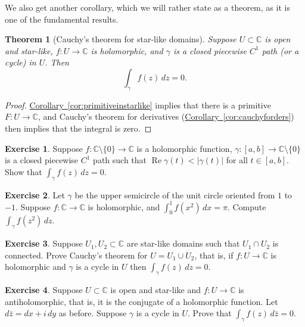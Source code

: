 \documentclass[12pt,openany]{book}
\renewcommand{\Re}{\operatorname{Re}}
\newcommand{\sabs}[1]{\lvert {#1} \rvert}
\newcommand{\C}{{\mathbb{C}}}
\theoremstyle{plain}
\newtheorem{thm}{Theorem}[section]
\theoremstyle{remark}
\theoremstyle{definition}
\newenvironment{exbox}{%
    \def\FrameCommand{\vrule width 1pt \relax\hspace {10pt}}%
    \MakeFramed {\advance \hsize -\width \FrameRestore }%
}{%
    \endMakeFramed
}
\theoremstyle{exercise}
\newtheorem{exercise}{Exercise}[section]
\theoremstyle{example}
\newcommand{\corref}[1]{\hyperref[#1]{Corollary~\ref*{#1}}}
\begin{document}
We also get another corollary, which we will rather state
as a theorem, as it is one of the fundamental results.

\begin{thm}[Cauchy's theorem for star-like domains]
%
Suppose $U \subset \C$ is open and star-like, $f \colon U \to \C$ is holomorphic,
and $\gamma$ is a closed piecewise $C^1$ path (or a cycle) in $U$.  Then
\begin{equation*}
\int_{\gamma} f(z) \, dz = 0 .
\end{equation*}
\end{thm}

\begin{proof}
\corref{cor:primitiveinstarlike} implies that there is
a primitive $F \colon U \to \C$, and
Cauchy's theorem for derivatives (\corref{cor:cauchyforders}) then implies that the integral is zero.
\end{proof}

\begin{exbox}
\begin{exercise}
Suppose $f \colon \C \setminus \{ 0 \} \to \C$ is a holomorphic function,
$\gamma \colon [a,b] \to \C \setminus \{ 0 \}$ is a closed piecewise $C^1$ path
such that $\Re \gamma(t) < \sabs{\gamma(t)}$ for all $t \in [a,b]$.
Show that $\int_\gamma f(z) \, dz = 0$.
\end{exercise}

\begin{exercise}
Let $\gamma$ be the upper semicircle of the unit circle oriented from $1$ to
$-1$.   Suppose $f \colon \C \to \C$ is holomorphic, and $\int_0^1 f(x^2) \,
dx = \pi$.  Compute $\int_\gamma f(z^2) \, dz$.
\end{exercise}

\begin{exercise}
Suppose $U_1, U_2 \subset \C$ are star-like domains such that $U_1 \cap U_2$
is connected.  Prove Cauchy's theorem for $U = U_1 \cup U_2$, that is,
if $f \colon U \to \C$ is holomorphic and $\gamma$ is a cycle in $U$
then $\int_\gamma f(z) \, dz = 0$.
\end{exercise}

\begin{exercise}
Suppose $U \subset \C$ is open and star-like and
$f \colon U \to \C$ is antiholomorphic, that is, it is the conjugate of a
holomorphic function.  Let $d\bar{z} = dx + i \, dy$ as before.  Suppose
$\gamma$ is a cycle in $U$.  Prove that
$\int_\gamma f(z) \, d\bar{z} = 0$.
\end{exercise}
\end{exbox}
\end{document}
